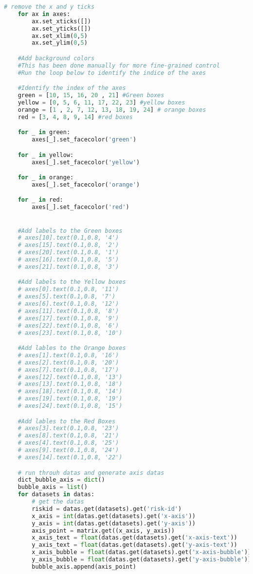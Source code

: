 \begin{lstlisting}[language=python, caption=Python LaTex - riskmatrix.py - Risxikomatrizen,captionpos=b,label={lst:riskmatrix},breaklines=true]
    # remove the x and y ticks
    for ax in axes:
        ax.set_xticks([])
        ax.set_yticks([])
        ax.set_xlim(0,5)
        ax.set_ylim(0,5)

    #Add background colors
    #This has been done manually for more fine-grained control
    #Run the loop below to identify the indice of the axes

    #Identify the index of the axes
    green = [10, 15, 16, 20 , 21] #Green boxes
    yellow = [0, 5, 6, 11, 17, 22, 23] #yellow boxes
    orange = [1 , 2, 7, 12, 13, 18, 19, 24] # orange boxes
    red = [3, 4, 8, 9, 14] #red boxes

    for _ in green:
        axes[_].set_facecolor('green')

    for _ in yellow:
        axes[_].set_facecolor('yellow')

    for _ in orange:
        axes[_].set_facecolor('orange')

    for _ in red:
        axes[_].set_facecolor('red')


    #Add labels to the Green boxes
    # axes[10].text(0.1,0.8, '4')
    # axes[15].text(0.1,0.8, '2')
    # axes[20].text(0.1,0.8, '1')
    # axes[16].text(0.1,0.8, '5')
    # axes[21].text(0.1,0.8, '3')

    #Add labels to the Yellow boxes
    # axes[0].text(0.1,0.8, '11')
    # axes[5].text(0.1,0.8, '7')
    # axes[6].text(0.1,0.8, '12')
    # axes[11].text(0.1,0.8, '8')
    # axes[17].text(0.1,0.8, '9')
    # axes[22].text(0.1,0.8, '6')
    # axes[23].text(0.1,0.8, '10')

    #Add lables to the Orange boxes
    # axes[1].text(0.1,0.8, '16')
    # axes[2].text(0.1,0.8, '20')
    # axes[7].text(0.1,0.8, '17')
    # axes[12].text(0.1,0.8, '13')
    # axes[13].text(0.1,0.8, '18')
    # axes[18].text(0.1,0.8, '14')
    # axes[19].text(0.1,0.8, '19')
    # axes[24].text(0.1,0.8, '15')

    #Add lables to the Red Boxes
    # axes[3].text(0.1,0.8, '23')
    # axes[8].text(0.1,0.8, '21')
    # axes[4].text(0.1,0.8, '25')
    # axes[9].text(0.1,0.8, '24')
    # axes[14].text(0.1,0.8, '22')

    # run throuh datas and generate axis datas
    dict_bubble_axis = dict()
    bubble_axis = list()
    for datasets in datas:
        # get the datas
        riskid = datas.get(datasets).get('risk-id')
        x_axis = int(datas.get(datasets).get('x-axis'))
        y_axis = int(datas.get(datasets).get('y-axis'))
        axis_point = matrix.get((x_axis, y_axis))
        x_axis_text = float(datas.get(datasets).get('x-axis-text'))
        y_axis_text = float(datas.get(datasets).get('y-axis-text'))
        x_axis_bubble = float(datas.get(datasets).get('x-axis-bubble'))
        y_axis_bubble = float(datas.get(datasets).get('y-axis-bubble'))
        bubble_axis.append(axis_point)


\end{lstlisting}
